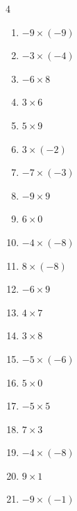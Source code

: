 \begin{multicols}{4}
\begin{enumerate}
  \item $-9\times (-9)$
        \phantom{$=81$}

  \item $-3\times (-4)$
        \phantom{$=12$}

  \item $-6\times 8$
        \phantom{$=-48$}

  \item $3\times 6$
        \phantom{$=18$}

  \item $5\times 9$
        \phantom{$=45$}

\columnbreak %

  \item $3\times (-2)$
        \phantom{$=-6$}

  \item $-7\times (-3)$
        \phantom{$=21$}

  \item $-9\times 9$
        \phantom{$=-81$}

  \item $6\times 0$
        \phantom{$=0$}

  \item $-4\times (-8)$
        \phantom{$=32$}

  \item $8\times (-8)$
        \phantom{$=-64$}

  \item $-6\times 9$
        \phantom{$=-54$}

  \item $4\times 7$
        \phantom{$=28$}

  \item $3\times 8$
        \phantom{$=24$}

  \item $-5\times (-6)$
        \phantom{$=30$}

  \item $5\times 0$
        \phantom{$=0$}

  \item $-5\times 5$
        \phantom{$=-25$}

  \item $7\times 3$
        \phantom{$=21$}

  \item $-4\times (-8)$
        \phantom{$=32$}

  \item $9\times 1$
        \phantom{$=9$}

  \item $-9\times (-1)$
        \phantom{$=9$}


\end{enumerate}
\end{multicols}
